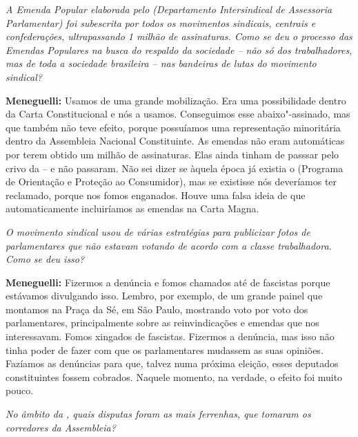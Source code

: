 \emph{A Emenda Popular elaborada pelo  (Departamento
Intersindical de Assessoria Parlamentar) foi subescrita por
todos os movimentos sindicais, centrais e confederações, ultrapassando 1
milhão de assinaturas. Como se deu o processo das Emendas Populares na
busca do respaldo da sociedade -- não só dos trabalhadores, mas de toda
a sociedade brasileira -- nas bandeiras de lutas do movimento sindical?}

\textbf{Meneguelli:} Usamos de uma grande mobilização. Era uma
possibilidade dentro da Carta Constitucional e nós a usamos. Conseguimos
esse abaixo"-assinado, mas que também não teve efeito, porque possuíamos
uma representação minoritária dentro da Assembleia Nacional
Constituinte. As emendas não eram automáticas por terem obtido um milhão
de assinaturas. Elas ainda tinham de passsar pelo crivo da  -- e não
passaram. Não sei dizer se àquela época já existia o  (Programa de
Orientação e Proteção ao Consumidor), mas se existisse nós deveríamos
ter reclamado, porque nos fomos enganados. Houve uma falsa ideia de que
automaticamente incluiríamos as emendas na Carta Magna.

\emph{O movimento sindical usou de várias estratégias para publicizar
fotos de parlamentares que não estavam votando de acordo com a classe
trabalhadora. Como se deu isso?}

\textbf{Meneguelli:} Fizermos a denúncia e fomos chamados até de
fascistas porque estávamos divulgando isso. Lembro, por exemplo, de um
grande painel que montamos na Praça da Sé, em São Paulo, mostrando voto
por voto dos parlamentares, principalmente sobre as reinvindicações e
emendas que nos interessavam. Fomos xingados de fascistas. Fizermos a
denúncia, mas isso não tinha poder de fazer com que os parlamentares
mudassem as suas opiniões. Fazíamos as denúncias para que, talvez numa
próxima eleição, esses deputados constituintes fossem cobrados. Naquele
momento, na verdade, o efeito foi muito pouco.

\emph{No âmbito da , quais disputas foram as mais ferrenhas, que
tomaram os corredores da Assembleia?}

